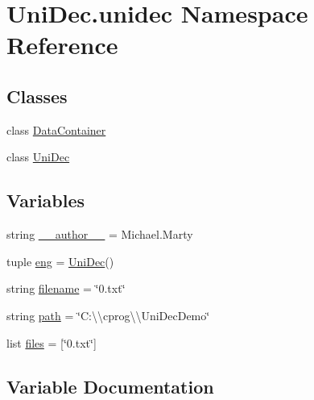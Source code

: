 \hypertarget{namespace_uni_dec_1_1unidec}{}\section{Uni\+Dec.\+unidec Namespace Reference}
\label{namespace_uni_dec_1_1unidec}
\subsection*{Classes}
\begin{DoxyCompactItemize}
\item 
class \hyperlink{class_uni_dec_1_1unidec_1_1_data_container}{Data\+Container}
\item 
class \hyperlink{class_uni_dec_1_1unidec_1_1_uni_dec}{Uni\+Dec}
\end{DoxyCompactItemize}
\subsection*{Variables}
\begin{DoxyCompactItemize}
\item 
string \hyperlink{namespace_uni_dec_1_1unidec_a365cc7ad629c4814f376796249dbfe4a}{\+\_\+\+\_\+author\+\_\+\+\_\+} = \textquotesingle{}Michael.\+Marty\textquotesingle{}
\item 
tuple \hyperlink{namespace_uni_dec_1_1unidec_a7c2c0858768f54afe4bf25593484db90}{eng} = \hyperlink{class_uni_dec_1_1unidec_1_1_uni_dec}{Uni\+Dec}()
\item 
string \hyperlink{namespace_uni_dec_1_1unidec_a646d6d6d853ea2dcd80859bdb716adce}{filename} = \char`\"{}0.txt\char`\"{}
\item 
string \hyperlink{namespace_uni_dec_1_1unidec_a7ad712bf884f73733763f363176d209f}{path} = \char`\"{}C\+:\textbackslash{}\textbackslash{}cprog\textbackslash{}\textbackslash{}\+Uni\+Dec\+Demo\char`\"{}
\item 
list \hyperlink{namespace_uni_dec_1_1unidec_a93a2af3de42083407c2a7c89e6601995}{files} = \mbox{[}\char`\"{}0.txt\char`\"{}\mbox{]}
\end{DoxyCompactItemize}


\subsection{Variable Documentation}
\hypertarget{namespace_uni_dec_1_1unidec_a365cc7ad629c4814f376796249dbfe4a}{}
